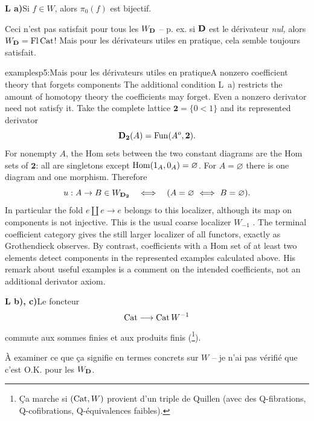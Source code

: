 \textbf{L a)}\enspace Si $f \in W$, alors $\pi_0(f)$ est bijectif.

Ceci n’est pas satisfait pour tous les $W_{\mathbf{D}}$ – p. ex. si $\mathbf{D}$ est le dérivateur \textit{nul,} alors $W_{\mathbf{D}} = \operatorname{Fl}\mathrm{Cat}$! Mais pour les dérivateurs utiles en pratique, cela semble toujours satisfait.

\begin{dcomment}{examples}{p5:Mais pour les dérivateurs utiles en pratique}{A nonzero coefficient theory that forgets components}
The additional condition L~a) restricts the amount of homotopy theory the coefficients may forget. Even a nonzero derivator need not satisfy it. Take the complete lattice $\mathbf 2=\{0<1\}$ and its represented derivator
\[
 \mathbf{D}_{\mathbf 2}(A)=\operatorname{Fun}(A^o,\mathbf 2).
\]
For nonempty $A$, the Hom sets between the two constant diagrams are the Hom sets of $\mathbf 2$: all are singletons except $\mathrm{Hom}(1_A,0_A)=\varnothing$. For $A=\varnothing$ there is one diagram and one morphism. Therefore
\[
 u:A\to B\in W_{\mathbf{D}_{\mathbf 2}}
 \quad\Longleftrightarrow\quad
 (A=\varnothing\ \Longleftrightarrow\ B=\varnothing).
\]
In particular the fold $e\amalg e\to e$ belongs to this localizer, although its map on components is not injective. This is the usual coarse localizer $W_{-1}$ \citep[Examples~3.3.5--3.3.6]{Cisinski2006}. The terminal coefficient category gives the still larger localizer of all functors, exactly as Grothendieck observes. By contrast, coefficients with a Hom set of at least two elements detect components in the represented examples calculated above. His remark about useful examples is a comment on the intended coefficients, not an additional derivator axiom.
\end{dcomment}


\textbf{L b), c)}\enspace Le foncteur
\[
\mathrm{Cat} \longrightarrow \mathrm{Cat}\, W^{-1}
\]
commute aux sommes finies et aux produits finis (\footnote{Ça marche si $(\mathrm{Cat}, W)$ provient d’un triple de Quillen (avec des Q-fibrations, Q-cofibrations, Q-équivalences faibles).}).

À examiner ce que ça signifie en termes concrets sur $W$ – je n’ai pas vérifié que c’est O.K. pour les $W_{\mathbf{D}}$.

